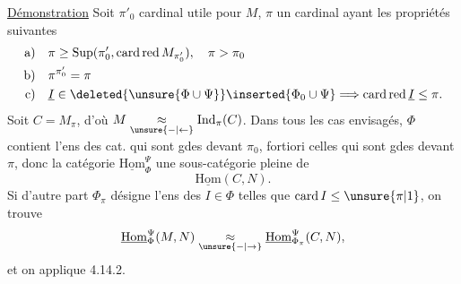 \uline{Démonstration} Soit $\pi'_0$   cardinal utile pour $M$, $\pi$ un cardinal ayant les propriétés suivantes
\[
\begin{aligned}
\text{a)}\quad &\pi\geq\operatorname{Sup}(\pi'_0,\operatorname{card\,red}M_{\pi'_0}),\quad\pi>\pi_0\\
\text{b)}\quad &\pi^{\pi'_0}=\pi\\
\text{c)}\quad &\underline I\in\deleted{\unsure{\Phi\cup\Psi}}\inserted{\Phi_0\cup\Psi}\Longrightarrow
\operatorname{card\,red}\underline I\leq\pi .
\end{aligned}
\]
  Soit $C=M_\pi$, d'où $M\underset{\unsure{-|\leftarrow}}{\approx}\mathrm{Ind}_\pi(C)$. Dans tous les cas envisagés, $\Phi$ contient l'ens des cat.  qui sont gdes devant $\pi_0$,  fortiori celles qui sont gdes devant $\pi$, donc la catégorie $\underline{\mathrm{Hom}}_\Phi^\Psi$   une sous-catégorie  pleine de
\[
\underline{\mathrm{Hom}}(C,N).
\]
Si d'autre part $\Phi_\pi$ désigne l'ens des $I\in\Phi$ telles que $\operatorname{card} I\leq\unsure{\pi|1}$, on trouve
\[
\underline{\mathrm{Hom}}_\Phi^\Psi(M,N)\underset{\unsure{-|\to}}{\approx}
\underline{\mathrm{Hom}}_{\Phi_\pi}^\Psi(C,N),
\]
et on applique 4.14.2.
